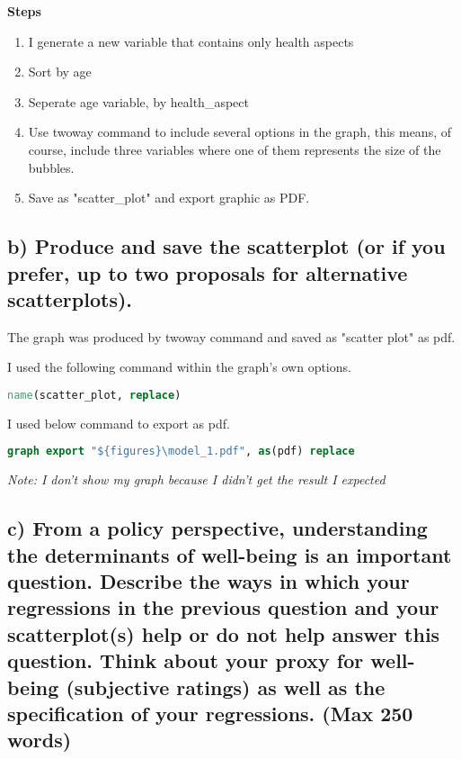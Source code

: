\documentclass[12pt,a4paper]{article}
\begin{document}
\textbf{Steps}

\begin{enumerate}
	\item I generate a new variable that contains only health aspects
	\item Sort by age
	\item Seperate age variable, by health\_aspect
	\item Use twoway command to include several options in the graph, this means, of course, include three variables where one of them represents the size of the bubbles.
	\item Save as "scatter\_plot" and export graphic as PDF.
\end{enumerate}

	\subsection*{\normalsize{b) Produce and save the scatterplot (or if you prefer, up to two proposals for alternative scatterplots).}}
	
	The graph was produced by twoway command and saved as "scatter plot" as pdf.
	
	I used the following command within the graph's own options.
	
	\begin{lstlisting}[language=Stata]
	name(scatter_plot, replace)
	\end{lstlisting}

	I used below command to export as pdf.
	
	\begin{lstlisting}[language=Stata]
	graph export "${figures}\model_1.pdf", as(pdf) replace
	\end{lstlisting}
	
	\textit{Note: I don't show my graph because I didn't get the result I expected}
	
	\subsection*{\normalsize{c) From a policy perspective, understanding the determinants of well-being is an important question. Describe the ways in which your regressions in the previous question and your scatterplot(s) help or do not help answer this question. Think about your proxy for well-being (subjective ratings) as well as the specification of your regressions. (Max 250 words)}}
	
\end{document}
